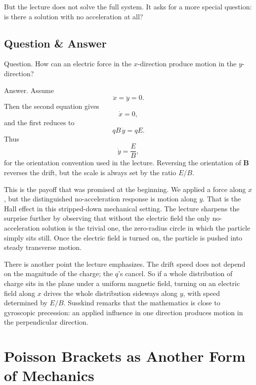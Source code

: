 But the lecture does not solve the full system. It asks for a more special question: is there a solution with no acceleration at all?

\subsection{Question \& Answer}

Question. How can an electric force in the \(x\)-direction produce motion in the \(y\)-direction?

Answer. Assume
\begin{equation}
\ddot x=\ddot y=0.
\end{equation}
Then the second equation gives
\begin{equation}
\dot x=0,
\end{equation}
and the first reduces to
\begin{equation}
qB\,\dot y=qE.
\end{equation}
Thus
\begin{equation}
\dot y=\frac{E}{B},
\end{equation}
for the orientation convention used in the lecture. Reversing the orientation of \(\mathbf B\) reverses the drift, but the scale is always set by the ratio \(E/B\).

This is the payoff that was promised at the beginning. We applied a force along \(x\), but the distinguished no-acceleration response is motion along \(y\). That is the Hall effect in this stripped-down mechanical setting. The lecture sharpens the surprise further by observing that without the electric field the only no-acceleration solution is the trivial one, the zero-radius circle in which the particle simply sits still. Once the electric field is turned on, the particle is pushed into steady transverse motion.

There is another point the lecture emphasizes. The drift speed does not depend on the magnitude of the charge; the \(q\)'s cancel. So if a whole distribution of charge sits in the plane under a uniform magnetic field, turning on an electric field along \(x\) drives the whole distribution sideways along \(y\), with speed determined by \(E/B\). Susskind remarks that the mathematics is close to gyroscopic precession: an applied influence in one direction produces motion in the perpendicular direction.

\section{Poisson Brackets as Another Form of Mechanics}


